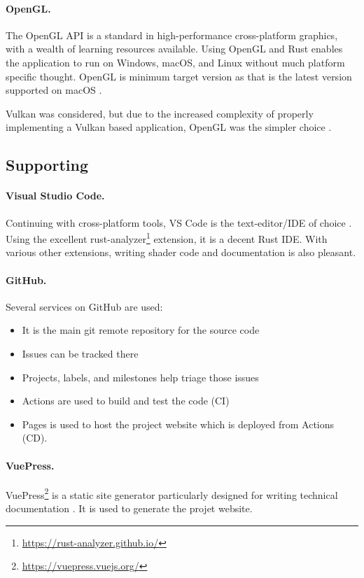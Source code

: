 \paragraph{OpenGL.}
The OpenGL API is a standard in high-performance cross-platform graphics, with a wealth of learning resources available.
Using OpenGL and Rust enables the application to run on Windows, macOS, and Linux without much platform specific thought. OpenGL  is minimum target version as that is the latest version supported on macOS \autocite{opengl_opengl_2020}.

Vulkan was considered, but due to the increased complexity of properly implementing a Vulkan based application, OpenGL was the simpler choice \autocite{vulkan_vulkan_2020}.

\subsection{Supporting}

\paragraph{Visual Studio Code.}
Continuing with cross-platform tools, VS Code is the text-editor/IDE of choice \autocite{visual_studio_code_visual_2020}.
Using the excellent rust-analyzer\footnote{\url{https://rust-analyzer.github.io/}} extension, it is a decent Rust IDE\@.
With various other extensions, writing shader code and documentation is also pleasant.

\paragraph{GitHub.}
Several services on GitHub \autocite{github_github_2020} are used:
\begin{itemize}
  \item It is the main git remote repository for the source code
  \item Issues can be tracked there
  \item Projects, labels, and milestones help triage those issues
  \item Actions are used to build and test the code (CI)
  \item Pages is used to host the project website which is deployed from Actions (CD).
\end{itemize}

\paragraph{VuePress.}
VuePress\footnote{\url{https://vuepress.vuejs.org/}} is a static site generator particularly designed for writing technical documentation \autocite{vuepress_vuepress_2020}.
It is used to generate the projet website.

